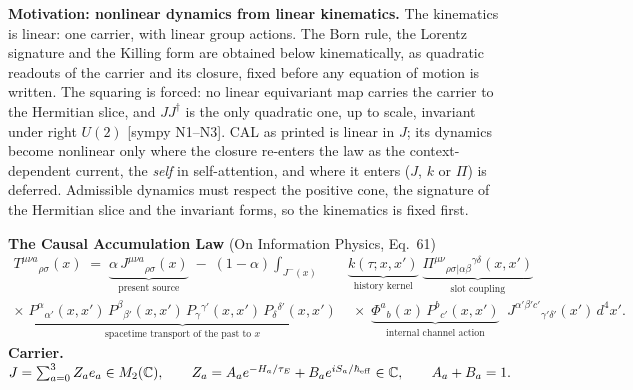 \documentclass[10pt]{article}
\newcommand{\Cp}{\mathbb{C}}
\newcommand{\Mt}{M_2(\Cp)}
\newcommand{\tg}[1]{{\scriptsize[#1]}}
\begin{document}
\vspace{2pt}
\textbf{Motivation: nonlinear dynamics from linear kinematics.} The kinematics is linear: one carrier, with linear group actions. The Born rule, the Lorentz signature and the Killing form are obtained below kinematically, as quadratic readouts of the carrier and its closure, fixed before any equation of motion is written. The squaring is forced: no linear equivariant map carries the carrier to the Hermitian slice, and $JJ^\dagger$ is the only quadratic one, up to scale, invariant under right $U(2)$ \tg{sympy N1--N3}. CAL as printed is linear in $J$; its dynamics become nonlinear only where the closure re-enters the law as the context-dependent current, the \emph{self} in self-attention, and where it enters ($J$, $k$ or $\Pi$) is deferred. Admissible dynamics must respect the positive cone, the signature of the Hermitian slice and the invariant forms, so the kinematics is fixed first.\par
{\large\textbf{The Causal Accumulation Law}} (On Information Physics, Eq.~61)
\[
\begin{aligned}
T^{\mu\nu a}{}_{\rho\sigma}(x) \;=\; \underbrace{\alpha\, J^{\mu\nu a}{}_{\rho\sigma}(x)}_{\text{present source}} \;-\; (1-\alpha)\int_{J^-(x)} &\underbrace{k(\tau;x,x')}_{\text{history kernel}}\;\underbrace{\Pi^{\mu\nu}{}_{\rho\sigma|\alpha\beta}{}^{\gamma\delta}(x,x')}_{\text{slot coupling}}\\
\times\;\underbrace{P^{\alpha}{}_{\alpha'}(x,x')\,P^{\beta}{}_{\beta'}(x,x')\,P_{\gamma}{}^{\gamma'}(x,x')\,P_{\delta}{}^{\delta'}(x,x')}_{\text{spacetime transport of the past to }x}
&\;\times\;\underbrace{\Phi^{a}{}_{b}(x)\,P^{b}{}_{c'}(x,x')}_{\text{internal channel action}}\;\; J^{\alpha'\beta'c'}{}_{\gamma'\delta'}(x')\,d^4x'.
\end{aligned}
\]
{\large\textbf{Carrier.}}\quad $J=\sum_{a=0}^{3}Z_ae_a\in\Mt,\qquad Z_a=A_ae^{-H_a/\tau_E}+B_ae^{iS_a/\hbar_{\rm eff}}\in\Cp,\qquad A_a+B_a=1.$
\end{document}
